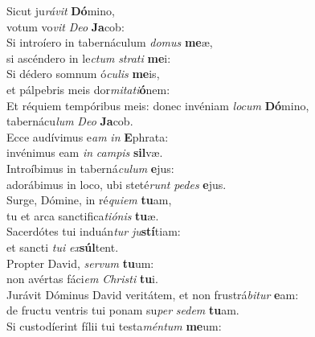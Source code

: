 \evenverse Sicut ju\textit{rá}\textit{vit} \textbf{Dó}mino,~\*\\
\evenverse votum vo\textit{vit} \textit{De}\textit{o} \textbf{Ja}cob:\\
\oddverse Si introíero in tabernáculum \textit{do}\textit{mus} \textbf{me}æ,~\*\\
\oddverse si ascéndero in le\textit{ctum} \textit{stra}\textit{ti} \textbf{me}i:\\
\evenverse Si dédero somnum ó\textit{cu}\textit{lis} \textbf{me}is,~\*\\
\evenverse et pálpebris meis dor\textit{mi}\textit{ta}\textit{ti}\textbf{ó}nem:\\
\oddverse Et réquiem tempóribus meis: donec invéniam \textit{lo}\textit{cum} \textbf{Dó}mino,~\*\\
\oddverse tabernácu\textit{lum} \textit{De}\textit{o} \textbf{Ja}cob.\\
\evenverse Ecce audívimus e\textit{am} \textit{in} \textbf{E}phrata:~\*\\
\evenverse invénimus eam \textit{in} \textit{cam}\textit{pis} \textbf{sil}væ.\\
\oddverse Introíbimus in taberná\textit{cu}\textit{lum} \textbf{e}jus:~\*\\
\oddverse adorábimus in loco, ubi steté\textit{runt} \textit{pe}\textit{des} \textbf{e}jus.\\
\evenverse Surge, Dómine, in ré\textit{qui}\textit{em} \textbf{tu}am,~\*\\
\evenverse tu et arca sanctifica\textit{ti}\textit{ó}\textit{nis} \textbf{tu}æ.\\
\oddverse Sacerdótes tui induán\textit{tur} \textit{ju}\textbf{stí}tiam:~\*\\
\oddverse et sancti \textit{tu}\textit{i} \textit{ex}\textbf{súl}tent.\\
\evenverse Propter David, \textit{ser}\textit{vum} \textbf{tu}um:~\*\\
\evenverse non avértas fáci\textit{em} \textit{Chri}\textit{sti} \textbf{tu}i.\\
\oddverse Jurávit Dóminus David veritátem, et non frustrá\textit{bi}\textit{tur} \textbf{e}am:~\*\\
\oddverse de fructu ventris tui ponam su\textit{per} \textit{se}\textit{dem} \textbf{tu}am.\\
\evenverse Si custodíerint fílii tui testa\textit{mén}\textit{tum} \textbf{me}um:~\*\\
